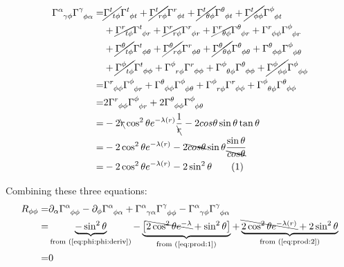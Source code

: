 \documentclass[]{article}
\newcommand\numberthis{\addtocounter{equation}{1}\tag{\theequation}}
\begin{document}
\begin{align*}
	\Gamma\indices{^\alpha_{\gamma\phi}} \Gamma\indices{^\gamma_{\phi\alpha}}=& \cancel{\Gamma\indices{^t_{t\phi}}} \Gamma\indices{^t_{\phi t}}+\cancel{\Gamma\indices{^t_{r\phi}}} \Gamma\indices{^r_{\phi t}}+\cancel{\Gamma\indices{^t_{\theta\phi}}} \Gamma\indices{^\theta_{\phi t}}+\cancel{\Gamma\indices{^t_{\phi\phi}}} \Gamma\indices{^\phi_{\phi t}}\\
	&+ \cancel{\Gamma\indices{^r_{t\phi}}} \Gamma\indices{^t_{\phi r}} + \cancel{\Gamma\indices{^r_{r\phi}}} \Gamma\indices{^r_{\phi r}}+ \cancel{\Gamma\indices{^r_{\theta\phi}}} \Gamma\indices{^\theta_{\phi r}}+ \Gamma\indices{^r_{\phi\phi}} \Gamma\indices{^\phi_{\phi r}}\\
	&+ \cancel{\Gamma\indices{^\theta_{t\phi}}} \Gamma\indices{^t_{\phi\theta}}+ \cancel{\Gamma\indices{^\theta_{r\phi}}} \Gamma\indices{^r_{\phi\theta}}+ \cancel{\Gamma\indices{^\theta_{\theta\phi}}} \Gamma\indices{^\theta_{\phi\theta}}+ \Gamma\indices{^\theta_{\phi\phi}} \Gamma\indices{^\phi_{\phi\theta}} \\
	&+ \cancel{\Gamma\indices{^\phi_{t\phi}}} \Gamma\indices{^t_{\phi\phi}}+ \Gamma\indices{^\phi_{r\phi}} \Gamma\indices{^r_{\phi\phi}}+ \Gamma\indices{^\phi_{\theta\phi}} \Gamma\indices{^\theta_{\phi\phi}}+ \cancel{\Gamma\indices{^\phi_{\phi\phi}}} \Gamma\indices{^\phi_{\phi\phi}}\\
	=& \Gamma\indices{^r_{\phi\phi}} \Gamma\indices{^\phi_{\phi r}}+  \Gamma\indices{^\theta_{\phi\phi}} \Gamma\indices{^\phi_{\phi\theta}} + \Gamma\indices{^\phi_{r\phi}} \Gamma\indices{^r_{\phi\phi}}+ \Gamma\indices{^\phi_{\theta\phi}} \Gamma\indices{^\theta_{\phi\phi}}\\
	=& 2 \Gamma\indices{^r_{\phi\phi}} \Gamma\indices{^\phi_{\phi r}}+  2 \Gamma\indices{^\theta_{\phi\phi}} \Gamma\indices{^\phi_{\phi\theta}}\\
	=& -2\bcancel{ r} \cos^2 \theta e^{- \lambda(r)} \frac{1}{\bcancel{r}}  - 2 cos\theta \sin\theta \tan\theta\\
	=& -2 \cos^2 \theta e^{- \lambda(r)}   - 2 \bcancel{cos\theta} \sin\theta \frac{\sin\theta}{\bcancel{cos\theta}} \\
	=& -2 \cos^2 \theta e^{- \lambda(r)}   - 2  \sin^2\theta  \numberthis \label{eq:prod:2}
\end{align*}


Combining these three equations:
\begin{align*} 
	R_{\phi\phi} =& \partial_\alpha \Gamma\indices{^\alpha_{\phi\phi}} - \partial_\phi \Gamma\indices{^\alpha_{\phi\alpha}} + \Gamma\indices{^\alpha_{\gamma\alpha}} \Gamma\indices{^\gamma_{\phi\phi}} - \Gamma\indices{^\alpha_{\gamma\phi}} \Gamma\indices{^\gamma_{\phi\alpha}}\\
	=&\underbrace{ -\sin^2\theta}_\text{from (\ref{eq:phi:phi:deriv})} - \underbrace{\big[\bcancel{2\cos^2\theta e^{-\lambda}} +\sin^2\theta\big]}_\text{from (\ref{eq:prod:1})} + \underbrace{\bcancel{2 \cos^2 \theta e^{- \lambda(r)}}   + 2  \sin^2\theta}_\text{from (\ref{eq:prod:2})}\\
	=&0
\end{align*}
\end{document}

